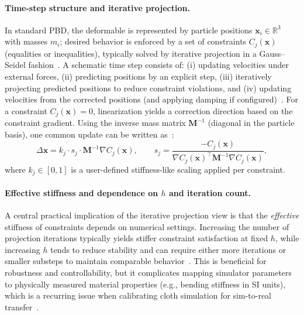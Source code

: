 \paragraph{Time-step structure and iterative projection.}
In standard \ac{PBD}, the deformable is represented by particle positions
$\mathbf{x}_i \in \mathbb{R}^3$ with masses $m_i$; desired behavior is enforced by a set of
constraints $C_j(\mathbf{x})$ (equalities or inequalities), typically solved by iterative
projection in a Gauss--Seidel fashion~\cite{muller2007pbd}.
A schematic time step consists of: (i) updating velocities under external forces,
(ii) predicting positions by an explicit step, (iii) iteratively projecting predicted positions
to reduce constraint violations, and (iv) updating velocities from the corrected positions
(and applying damping if configured)~\cite{muller2007pbd}.
For a constraint $C_j(\mathbf{x}) = 0$, linearization yields a correction direction based on the
constraint gradient. Using the inverse mass matrix $\mathbf{M}^{-1}$ (diagonal in the particle
basis), one common update can be written as~\cite{muller2007pbd,macklin2016xpbd}:
\begin{equation}
\Delta \mathbf{x} = k_j \cdot s_j \cdot \mathbf{M}^{-1}\nabla C_j(\mathbf{x}), \qquad
s_j = \frac{-C_j(\mathbf{x})}{\nabla C_j(\mathbf{x})^\top \mathbf{M}^{-1} \nabla C_j(\mathbf{x})},
\label{eq:pbd_correction}
\end{equation}
where $k_j \in [0,1]$ is a user-defined stiffness-like scaling applied per constraint.

\paragraph{Effective stiffness and dependence on $h$ and iteration count.}
A central practical implication of the iterative projection view is that the \emph{effective}
stiffness of constraints depends on numerical settings. Increasing the number of projection
iterations typically yields stiffer constraint satisfaction at fixed $h$, while increasing $h$
tends to reduce stability and can require either more iterations or smaller substeps to
maintain comparable behavior~\cite{muller2007pbd,macklin2016xpbd,Macklin2019SmallSteps}.
This is beneficial for robustness and controllability, but it complicates mapping simulator
parameters to physically measured material properties (e.g., bending stiffness in SI units),
which is a recurring issue when calibrating cloth simulation for sim-to-real
transfer~\cite{macklin2016xpbd,Salvato2021RealityGapSurvey}.

